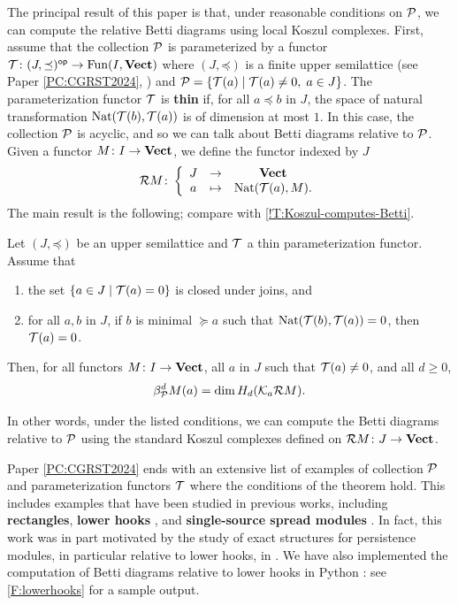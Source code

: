 The principal result of this paper is that, under reasonable conditions on $\mathcal{P}$, we can compute the relative Betti diagrams using local Koszul complexes. First, assume that the collection $\mathcal{P}$ is parameterized by a functor $\mathcal{T} \colon (J, \mathord{\preceq})^{\mathsf{op}} \to \operatorname{Fun}(I, \operatorname{\mathbf{Vect}})$ where $(J, \mathord{\preceq})$ is a finite upper semilattice (see Paper \ref{PC:CGRST2024}, ) and $\mathcal{P} = \{\mathcal{T}(a) \mid \mathcal{T}(a) \neq 0, \; a \in J\}$. The parameterization functor $\mathcal{T}$ is \textbf{thin} if, for all $a \preceq b$ in $J$, the space of natural transformation $\operatorname{Nat}(\mathcal{T}(b), \mathcal{T}(a))$ is of dimension at most $1$. In this case, the collection $\mathcal{P}$ is acyclic, and so we can talk about Betti diagrams relative to $\mathcal{P}$.
Given a functor $M \colon I \to \operatorname{\mathbf{Vect}}$, we define the functor indexed by $J$
\[
  \mathcal{R} M \colon \left\{ \begin{array}{ccc}
    J & \to & \operatorname{\mathbf{Vect}} \\
    a & \mapsto & \operatorname{Nat}(\mathcal{T}(a), M).
  \end{array} \right.
\]
The main result is the following; compare with \cref{!T:Koszul-computes-Betti}.

\begin{theorem}
  Let $(J, \mathord{\preceq})$ be an upper semilattice and $\mathcal{T}$ a thin parameterization functor. Assume that
  \begin{enumerate}
    \item the set $\{a \in J \mid \mathcal{T}(a) = 0\}$ is closed under joins, and
    \item for all $a, b$ in $J$, if $b$ is minimal $\succeq a$ such that $\operatorname{Nat}(\mathcal{T}(b), \mathcal{T}(a)) = 0$, then $\mathcal{T}(a) = 0$.
  \end{enumerate}
  Then, for all functors $M \colon I \to \operatorname{\mathbf{Vect}}$, all $a$ in $J$ such that $\mathcal{T}(a) \neq 0$, and all $d \geq 0$,
  \[
    \beta_{\mathcal{P}}^d M(a) = \dim H_d(\mathcal{K}_a \mathcal{R} M).
  \]
\end{theorem}

In other words, under the listed conditions, we can compute the Betti diagrams relative to $\mathcal{P}$ using the standard Koszul complexes defined on $\mathcal{R} M \colon J \to \operatorname{\mathbf{Vect}}$.

Paper \ref{PC:CGRST2024} ends with an extensive list of examples of collection $\mathcal{P}$ and parameterization functors $\mathcal{T}$ where the conditions of the theorem hold. This includes examples that have been studied in previous works, including \textbf{rectangles}, \textbf{lower hooks} \cite{BOO2025}, and \textbf{single-source spread modules} \cite{BBH2024}. In fact, this work was in part motivated by the study of exact structures for persistence modules, in particular relative to lower hooks, in \cite[Section 4]{BOO2025}. We have also implemented the computation of Betti diagrams relative to lower hooks in Python \cite{lowerhooks}: see \cref{F:lowerhooks} for a sample output.

